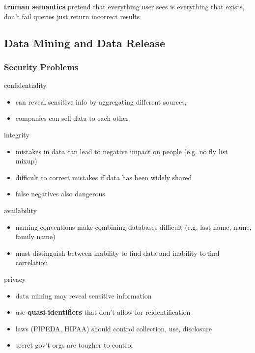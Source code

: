 \documentclass[]{article}
\theoremstyle{definition}
\begin{document}
	\textbf{truman semantics} pretend that everything user sees is everything that exists, don't fail queries just return incorrect results

	\subsection{Data Mining and Data Release}
	\subsubsection{Security Problems}
	confidentiality
	\begin{itemize}
		\item can reveal sensitive info by aggregating different sources, 
		\item companies can sell data to each other
	\end{itemize}

	integrity
	\begin{itemize}
		\item mistakes in data can lead to negative impact on people (e.g. no fly list mixup)
		\item difficult to correct mistakes if data has been widely shared
		\item false negatives also dangerous
	\end{itemize}

	availability
	\begin{itemize}
		\item naming conventions make combining databases difficult (e.g. last name, name, family name)
		\item must distinguish between inability to find data and inability to find correlation
	\end{itemize}

	privacy
	\begin{itemize}
		\item data mining may reveal sensitive information
		\item use \textbf{quasi-identifiers} that don't allow for reidentification
		\item laws (PIPEDA, HIPAA) should control collection, use, disclosure
		\item secret gov't orgs are tougher to control
	\end{itemize}
\end{document}
